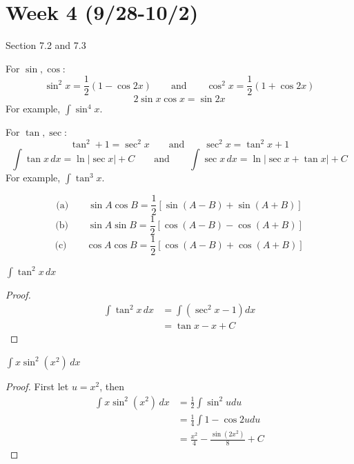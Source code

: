 \documentclass[openany]{book}
\begin{document}
\newpage 
\section*{\centering Week 4 (9/28-10/2)}
Section 7.2 and 7.3
\begin{prop}
For $\sin, \cos$:
\[
\sin^2 x = \frac{1}{2}(1-\cos 2x)
\qquad \text{and} \qquad
\cos^2 x = \frac{1}{2}(1+\cos 2x)
\]
\begin{equation*}
    2\sin x\cos x=\sin 2x
\end{equation*}
For example, $\int\sin^4x$.
\end{prop}

\begin{prop}
    For $\tan, \sec$:
    \begin{equation*}
        \tan^2+1=\sec^2x \qquad \text{and} \qquad \sec^2x=\tan^2x+1
    \end{equation*}
    \[
\int \tan x\,dx = \ln|\sec x| + C \qquad \text{and} \qquad \int \sec x\,dx = \ln|\sec x + \tan x| + C
\]
For example, $\int\tan^3x$.
\end{prop}


\begin{prop}
    \begin{equation*}
        \text{(a)}\qquad
\sin A \cos B
=
\frac{1}{2}\left[\sin(A-B)+\sin(A+B)\right]
    \end{equation*}
    \[
\text{(b)}\qquad
\sin A \sin B
=
\frac{1}{2}\left[\cos(A-B)-\cos(A+B)\right]
\]
\[
\text{(c)}\qquad
\cos A \cos B
=
\frac{1}{2}\left[\cos(A-B)+\cos(A+B)\right]
\]
\end{prop}

\begin{prob}
    $\displaystyle \int \tan^2 x\,dx$
\end{prob}
\begin{proof}
    \begin{align*}
        \int \tan^2 x\,dx&=\int(\sec^2x-1)dx\\
        &=\tan x-x+C
    \end{align*}
\end{proof}


\begin{prob}
    $\displaystyle \int x\sin^2(x^2)\,dx$
\end{prob}
\begin{proof}
    First let $u=x^2$, then 
    \begin{align*}
        \int x\sin^2(x^2)\,dx&=\frac{1}{2}\int \sin^2 udu\\
        &=\frac{1}{4}\int 1-\cos 2udu\\
        &=\frac{x^2}{4}-\frac{\sin(2x^2)}{8}+C
    \end{align*}
\end{proof}
\end{document}
